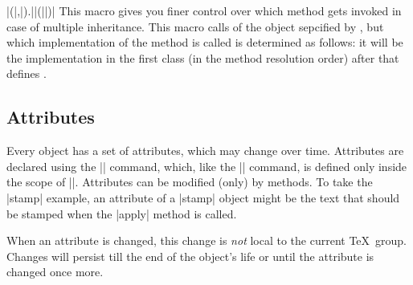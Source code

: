 \begin{pgfmanualentry}
\begin{command}{\pgfoothis}
\begin{codeexample}
\end{codeexample}
  \end{command}
\end{pgfmanualentry}


\begin{command}{\pgfoosuper|(|,|).||(||)|}
  This macro gives you finer control over which method gets invoked in
  case of multiple inheritance. This macro calls  of
  the object sepcified by , but which
  implementation of the method is called is determined as follows: it
  will be the implementation in the first class (in the method
  resolution order) after  that defines . 
\end{command}

\subsection{Attributes}

Every object has a set of attributes, which may change over
time. Attributes are declared using the |\attribute| command, which,
like the |\method| command, is defined only inside the scope of
|\pgfooclass|. Attributes can be modified (only) by methods. To take
the |stamp| example, an attribute of a |stamp| object might be the
text that should be stamped when the |apply| method is called.

When an attribute is changed, this change is \emph{not} local to the
current \TeX\ group. Changes will persist till the end
of the object's life or until the attribute is changed once more.

